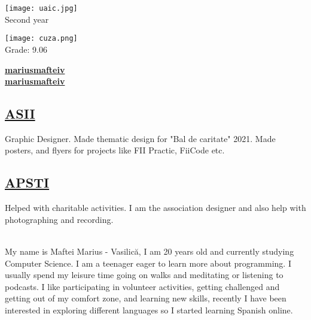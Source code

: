 \documentclass[a4paper]{MagicalCV}
\begin{document}
\lastupdated


\hfill \break





\begin{minipage}[t]{0.38\textwidth} 



\texttt{[image: uaic.jpg]} 
 \\
\vspace{\topsep} %
Second year
\sectionsep

\texttt{[image: cuza.png]} 
\\ 
\vspace{\topsep} %
Grade: 9.06
\sectionsep


 \href{https://github.com/mariusmafteiv}{\bf mariusmafteiv} \\
 \href{https://www.linkedin.com/in/mariusmafteiv/}{\bf mariusmafteiv}
\sectionsep

\subsection{\href{https://www.asii.ro/}{ASII}}
Graphic Designer.
Made thematic design for "Bal de caritate" 2021.
Made posters, and flyers for projects like FII Practic, FiiCode etc.
\sectionsep

\subsection{\href{https://www.facebook.com/AsociatiaPSTI}{APSTI}}
Helped with charitable activities. I am the association designer and also help with photographing and recording.
\sectionsep

\\
My name is Maftei Marius - Vasilică, I am 20 years old and currently studying Computer Science. I am a teenager eager to learn more about programming. I usually spend my leisure time going on walks and meditating or listening to podcasts. I like participating in volunteer activities, getting challenged and getting out of my comfort zone, and learning new skills, recently I have been interested in exploring different languages so I started learning Spanish online.

\end{minipage} 
\end{document}

